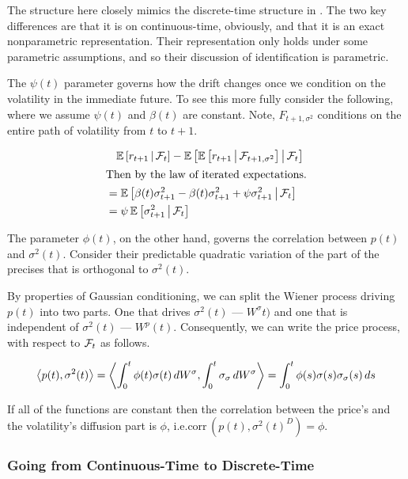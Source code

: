 \documentclass[11pt, letterpaper, twoside, final]{article}
\begin{document}
The structure here closely mimics the discrete-time structure in \textcite{khrapov2016affine}.
The two key differences are that it is on continuous-time, obviously, and that it is an exact nonparametric
representation.
Their representation only holds under some parametric assumptions, and so their discussion of identification is
parametric.


The $\psi(t)$ parameter governs how the drift changes once we condition on the volatility in the immediate
future.
To see this more fully consider the following, where we assume $\psi(t)$ and $\beta(t)$ are constant.
Note, $F_{t+1, \sigma^2}$ conditions on the entire path of volatility from $t$ to $t+1$.


\begin{align}
    &\phantom{=} \E\left[r_{t+1} \mvert \F_{t}\right]  - \E\left[\E\left[r_{t+1} \mvert \F_{t+1, \sigma^2} \right]
      \mvert \F_t \right]  \\
      \intertext{Then by the law of iterated expectations.}
    &=  \E\left[\beta(t) \sigma^2_{t+1} - \beta(t) \sigma^2_{t+1} + \psi \sigma^2_{t+1}  \mvert \F_t \right] \\
      \label{eqn:change_in_expected_rtn}
      &= \psi \E\left[\sigma^2_{t+1} \mvert \F_t \right]
\end{align}

The parameter $\phi(t)$, on the other hand, governs the correlation between $p(t)$ and $\sigma^2(t)$.
Consider their predictable quadratic variation of the part of the precises that is orthogonal to $\sigma^2(t)$.

By properties of Gaussian conditioning, we can split the Wiener process driving $p(t)$ into two parts.
One that drives $\sigma^2(t)$ --- $W^{\sigma}t)$ and one that is independent of $\sigma^2(t)$ --- $W^p(t)$.
Consequently, we can write the price process, with respect to $\F_t$ as follows.

\begin{equation}
    \predQV*{p(t), \sigma^2(t)}  
    = \predQV*{\int^t_0 \phi(t) \sigma(t) \dif W^{\sigma}, \int^t_0 \sigma_{\sigma} \dif W^{\sigma}} 
    = \int^t_0 \phi(s) \sigma(s) \sigma_{\sigma}(s) \dif s
\end{equation}

If all of the functions are  constant then the correlation between the price's and the volatility's diffusion part
is $\phi$, i.e.\@  $\mathrm{corr}\,(p(t), {\sigma^2(t)}^D) = \phi$.

\subsubsection{Going from Continuous-Time to Discrete-Time}\label{sec:discrete_time_to_cont_time}
\end{document}
